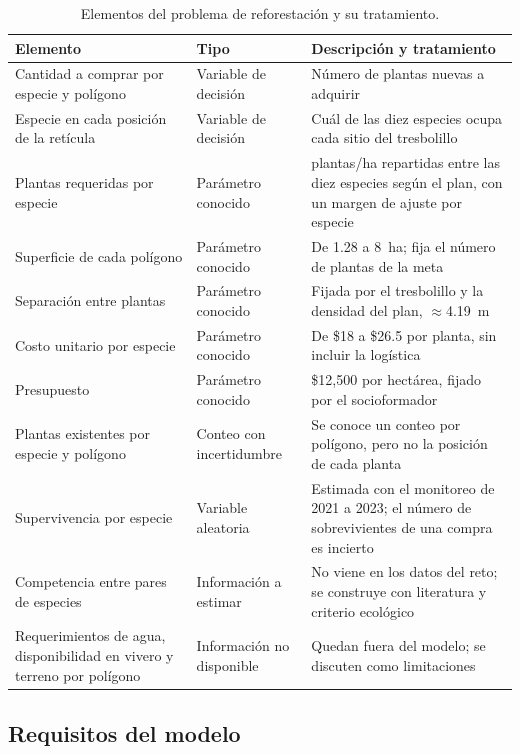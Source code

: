 \begin{table}[t]
\centering
\caption{Elementos del problema de reforestación y su tratamiento.}
\label{tab:variables}
\small
\begin{tabularx}{\textwidth}{@{}>{\RaggedRight\arraybackslash}p{}>{\RaggedRight\arraybackslash}p{}>{\RaggedRight\arraybackslash}X@{}}
\toprule
Elemento & Tipo & Descripción y tratamiento \\
\midrule
Cantidad a comprar por especie y polígono & Variable de decisión & Número de plantas nuevas a adquirir \\
Especie en cada posición de la retícula & Variable de decisión & Cuál de las diez especies ocupa cada sitio del tresbolillo \\
Plantas requeridas por especie & Parámetro conocido & 658 plantas/ha repartidas entre las diez especies según el plan, con un margen de ajuste por especie \\
Superficie de cada polígono & Parámetro conocido & De 1.28 a 8~ha; fija el número de plantas de la meta \\
Separación entre plantas & Parámetro conocido & Fijada por el tresbolillo y la densidad del plan, $\approx$4.19~m \\
Costo unitario por especie & Parámetro conocido & De \$18 a \$26.5 por planta, sin incluir la logística \\
Presupuesto & Parámetro conocido & \$12{,}500 por hectárea, fijado por el socioformador \\
Plantas existentes por especie y polígono & Conteo con incertidumbre & Se conoce un conteo por polígono, pero no la posición de cada planta \\
Supervivencia por especie & Variable aleatoria & Estimada con el monitoreo de 2021 a 2023; el número de sobrevivientes de una compra es incierto \\
Competencia entre pares de especies & Información a estimar & No viene en los datos del reto; se construye con literatura y criterio ecológico \\
Requerimientos de agua, disponibilidad en vivero y terreno por polígono & Información no disponible & Quedan fuera del modelo; se discuten como limitaciones \\
\bottomrule
\end{tabularx}
\end{table}

\subsection{Requisitos del modelo}
\label{subsec:requisitos}

